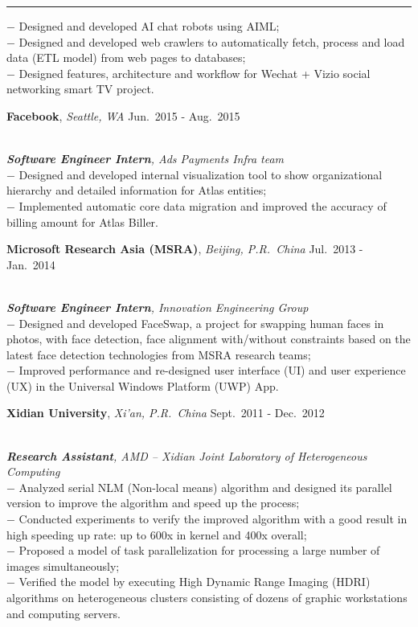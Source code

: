 \documentclass[a4paper,10pt]{article}
\newcommand{\shadedsection}[1]{
    \setlength{\fboxsep}{0pt}
    \colorbox{shadecolor}{%
        \begin{minipage}{\linewidth}%
            \vspace{0.2em}%
            #1%
        \end{minipage}%
    }
}
\newenvironment{rSection}[1]{ %
  \medskip
  \hspace{-1.5em}{\color{Blue}\MakeUppercase{\large \bf {#1}}} %
  \vspace{-0.2em}
  \medskip
  \hrule %
  \begin{list}{}{ %
    \setlength{\leftmargin}{1.5em} %
  }
\setlength{\itemsep}{1pt}
  \item[]
}{
  \end{list}
}
\newcommand{\detail}[1]{{$-$ {#1}}}
\newcommand{\period}[3]{\normalsize {#1} \hfill {#2} - {#3}}
\begin{document}
\begin{rSection}{Experience}
    \detail{Designed and developed AI chat robots using AIML;}\\
    \detail{Designed and developed web crawlers to automatically fetch, process and load data (ETL model) from web pages to databases;}\\
    \detail{Designed features, architecture and workflow for Wechat + Vizio social networking smart TV project.}
  \item
    \shadedsection{\period{{\bf Facebook}, {\em Seattle, WA}}{Jun.~2015}{Aug.~2015}}\\
    {\em {\bf Software Engineer Intern}, Ads Payments Infra team}\\
    \detail{Designed and developed internal visualization tool to show organizational hierarchy and detailed information for Atlas entities;}\\
    \detail{Implemented automatic core data migration and improved the accuracy of billing amount for Atlas Biller.}
  \item
    \shadedsection{\period{{\bf Microsoft Research Asia (MSRA)}, {\em Beijing, P.R.~China}}{Jul.~2013}{Jan.~2014}}\\
    {\em {\bf Software Engineer Intern}, Innovation Engineering Group}\\
    \detail{Designed and developed FaceSwap, a project for swapping human faces in photos, with face detection, face alignment with/without constraints based on the latest face detection technologies from MSRA research teams;}\\
    \detail{Improved performance and re-designed user interface (UI) and user experience (UX) in the Universal Windows Platform (UWP) App.}
  \item
    \shadedsection{\period{{\bf Xidian University}, {\em Xi'an, P.R.~China}}{Sept.~2011}{Dec.~2012}}\\
    {\em {\bf Research Assistant}, AMD -- Xidian Joint Laboratory of Heterogeneous Computing}\\
    \detail{Analyzed serial NLM (Non-local means) algorithm and designed its parallel version to improve the algorithm and speed up the process;}\\
    \detail{Conducted experiments to verify the improved algorithm with a good result in high speeding up rate: up to 600x in kernel and 400x overall;}\\
    \detail{Proposed a model of task parallelization for processing a large number of images simultaneously;}\\
    \detail{Verified the model by executing High Dynamic Range Imaging (HDRI) algorithms on heterogeneous clusters consisting of dozens of graphic workstations and computing servers.}
\end{rSection}
\end{document}
